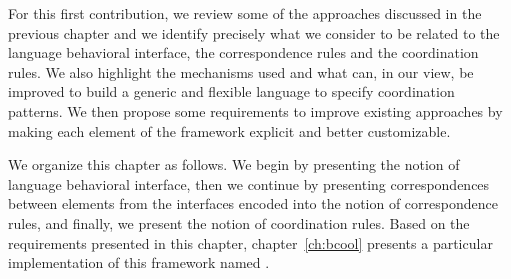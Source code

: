 For this first contribution, we review some of the approaches discussed in the previous chapter and we identify precisely what we consider to be related to the language behavioral interface, the correspondence rules and the coordination rules. We also highlight the mechanisms used and what can, in our view, be improved to build a generic and flexible language to specify coordination patterns. We then propose some requirements to improve existing approaches by making each element of the framework explicit and better customizable.  

We organize this chapter as follows. We begin by presenting the notion of language behavioral interface, then we continue by presenting correspondences between elements from the interfaces encoded into the notion of correspondence rules, and finally, we present the notion of coordination rules. Based on the requirements presented in this chapter, chapter~\ref{ch:bcool} presents a particular implementation of this framework named \bcool.

